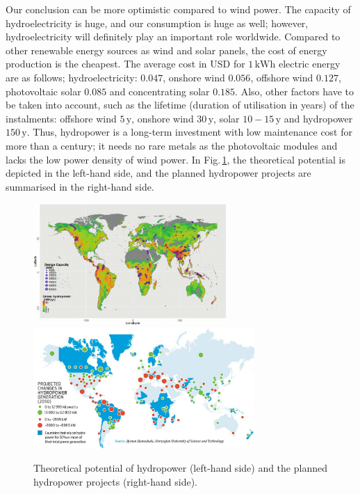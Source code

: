 Our conclusion can be more optimistic compared to wind power. The capacity of hydroelectricity is huge, and our consumption is huge as well; however, hydroelectricity will definitely play an important role worldwide. Compared to other renewable energy sources as wind and solar panels, the cost of energy production is the cheapest. The average cost in USD for $1\,\mathrm{kWh}$ electric energy are as follows; hydroelectricity: $0.047$, onshore wind $0.056$, offshore wind $0.127$, photovoltaic solar $0.085$ and concentrating solar $0.185$. Also, other factors have to be taken into account, such as the lifetime (duration of utilisation in years) of the instalments: offshore wind $5\,\mathrm{y}$, onshore wind $30\,\mathrm{y}$, solar $10-15\,\mathrm{y}$ and hydropower $150\,\mathrm{y}$. Thus, hydropower is a long-term investment with low maintenance cost for more than a century; it needs no rare metals as the photovoltaic modules and lacks the low power density of wind power. In Fig.\,\ref{Fig:global_hydropower_potential}, the theoretical potential is depicted in the left-hand side, and the planned hydropower projects are summarised in the right-hand side.

\begin{figure}[ht!]
	\centering
		\includegraphics[height=4.6cm]{HydroAndWindPower/Figures/Global_Hydropower_Potential.png}
		\includegraphics[height=4.6cm]{HydroAndWindPower/Figures/The_Future_Of_Hydropower.jpg}
	\caption{Theoretical potential of hydropower (left-hand side) and the planned hydropower projects (right-hand side).}
	\label{Fig:global_hydropower_potential}
\end{figure}



\clearpage